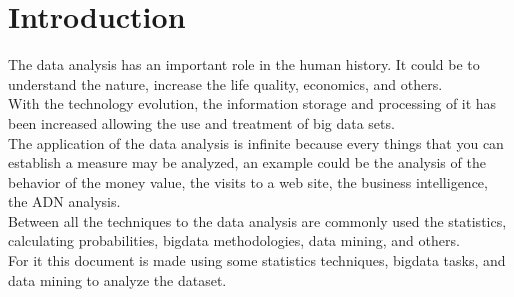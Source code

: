 \section{Introduction}
 The data analysis has an important role in the human history. It could be to understand the nature, increase the life quality, economics, and others.\\
 With the technology evolution, the information storage and processing of it has been increased allowing the use and treatment of big data sets.\\
 The application of the data analysis is infinite because every things that you can establish a measure may be analyzed, an example could be the analysis of the behavior of the money value, the visits to a web site, the business intelligence, the ADN analysis.\\
 Between all the techniques to the data analysis are commonly used the statistics, calculating probabilities, bigdata methodologies, data mining, and others.\\
 For it this document is made using some statistics techniques, bigdata tasks, and data mining to analyze the dataset.
